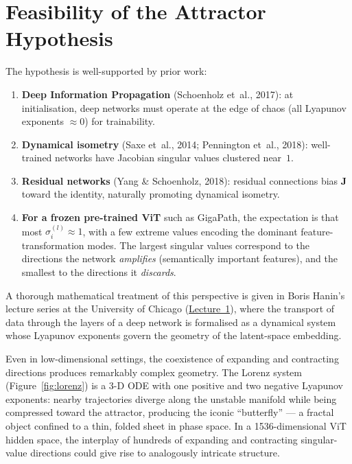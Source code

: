 \documentclass[11pt]{article}
\newcommand{\mat}[1]{\mathbf{#1}}
\begin{document}
\section{Feasibility of the Attractor Hypothesis}

The hypothesis is well-supported by prior work:

\begin{enumerate}
    \item \textbf{Deep Information Propagation} (Schoenholz et~al., 2017):
        at initialisation, deep networks must operate at the edge of chaos
        (all Lyapunov exponents $\approx 0$) for trainability.

    \item \textbf{Dynamical isometry} (Saxe et~al., 2014; Pennington
        et~al., 2018): well-trained networks have Jacobian singular values
        clustered near~$1$.

    \item \textbf{Residual networks} (Yang \& Schoenholz, 2018): residual
        connections bias $\mat{J}$ toward the identity, naturally
        promoting dynamical isometry.

    \item \textbf{For a frozen pre-trained ViT} such as GigaPath, the
        expectation is that most $\sigma_i^{(l)} \approx 1$, with a few
        extreme values encoding the dominant feature-transformation modes.
        The largest singular values correspond to the directions the
        network \emph{amplifies} (semantically important features), and
        the smallest to the directions it \emph{discards}.
\end{enumerate}

\noindent
A thorough mathematical treatment of this perspective is given in
Boris Hanin's lecture series at the University of Chicago
(\href{https://www.youtube.com/watch?v=4SVWo5kspR8}{Lecture~1}),
where the transport of data through the layers of a deep network is
formalised as a dynamical system whose Lyapunov exponents govern the
geometry of the latent-space embedding.

Even in low-dimensional settings, the coexistence of expanding and
contracting directions produces remarkably complex geometry.  The
Lorenz system (Figure~\ref{fig:lorenz}) is a 3-D ODE with one positive
and two negative Lyapunov exponents: nearby trajectories diverge along
the unstable manifold while being compressed toward the attractor, producing
the iconic ``butterfly'' --- a fractal object confined to a thin,
folded sheet in phase space.  In a 1536-dimensional ViT hidden space,
the interplay of hundreds of expanding and contracting singular-value
directions could give rise to analogously intricate structure.
\end{document}
